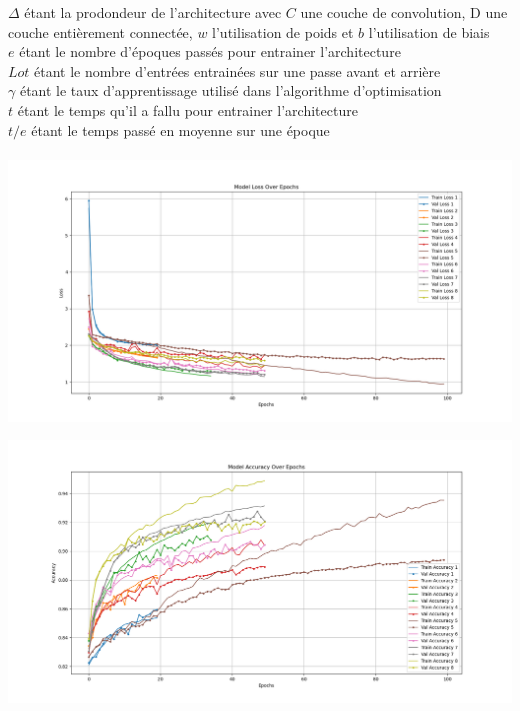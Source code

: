 \begin{multicols}{2}
{$\Delta$ étant la prodondeur de l'architecture avec $C$ une couche de convolution, D une couche entièrement connectée, $w$ l'utilisation de poids et $b$ l'utilisation de biais \\

$e$ étant le nombre d'époques passés pour entrainer l'architecture \\

$Lot$ étant le nombre d'entrées entrainées sur une passe avant et arrière \\

$\gamma$ étant le taux d'apprentissage utilisé dans l'algorithme d'optimisation \\

$t$ étant le temps qu'il a fallu pour entrainer l'architecture \\

$t/e$ étant le temps passé en moyenne sur une époque \\
} \\

\includegraphics[width=\columnwidth]{images/cifar_10_losses.png}
\hfill\break

\includegraphics[width=\columnwidth]{images/cifar_10_accuracies.png}
\hfill\break


\end{multicols}
